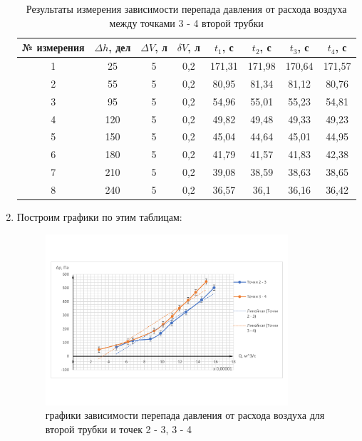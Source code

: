 \documentclass[11pt,a4paper]{article}
\begin{document}
\begin{enumerate}
\begin{table}[h!]
\centering
\begin{tabular}{|c|c|c|c|c|c|c|c|}
\hline
№ измерения & $\Delta h$, дел & $\Delta V$, л & $\delta V$, л & $t_{1}$, с & $t_{2}$, с & $t_{3}$, с & $t_{4}$, с \\ \hline
1           & 25              & 5             & 0,2           & 171,31     & 171,98     & 170,64     & 171,57     \\ \hline
2           & 55              & 5             & 0,2           & 80,95      & 81,34      & 81,12      & 80,76      \\ \hline
3           & 95              & 5             & 0,2           & 54,96      & 55,01      & 55,23      & 54,81      \\ \hline
4           & 120             & 5             & 0,2           & 49,82      & 49,48      & 49,33      & 49,23      \\ \hline
5           & 150             & 5             & 0,2           & 45,04      & 44,64      & 45,01      & 44,95      \\ \hline
6           & 180             & 5             & 0,2           & 41,79      & 41,57      & 41,83      & 42,38      \\ \hline
7           & 210             & 5             & 0,2           & 39,08      & 38,59      & 38,63      & 38,65      \\ \hline
8           & 240             & 5             & 0,2           & 36,57      & 36,1       & 36,16      & 36,42      \\ \hline
\end{tabular}
\caption{Результаты измерения зависимости перепада давления от расхода воздуха между точками 3 - 4 второй трубки}
\label{tab:flow_measuring_3_4_second_tube}
\end{table}

\item Построим графики по этим таблицам:

\begin{figure}[h!]
	\begin{center}
		\includegraphics[width = 0.85\textwidth]{Results_of_measuring}
		\caption{графики зависимости перепада давления от расхода воздуха для второй трубки и точек 2 - 3, 3 - 4}
		\label{fig:graph_1}
	\end{center}
\end{figure}


\end{enumerate}
\end{document}
